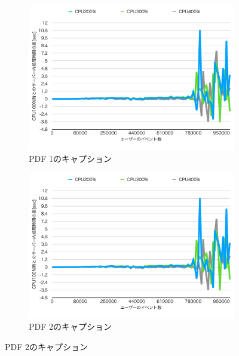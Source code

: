 \documentclass[../../../../../main]{subfiles}
\begin{document}
    \begin{figure}[htbp]
        \centering
        \begin{subfigure}{.48\linewidth}
            \centering
            \includegraphics[width=\linewidth]{graph}
            \caption{PDF 1のキャプション}
            \label{fig:pdf1}
        \end{subfigure}\hfill
        \begin{subfigure}{.48\linewidth}
            \centering
            \includegraphics[width=\linewidth]{graph}
            \caption{PDF 2のキャプション}
            \label{fig:pdf2}
        \end{subfigure}


\end{figure}
\end{document}
